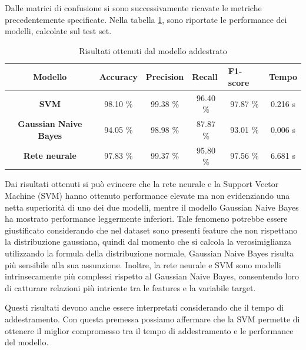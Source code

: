 Dalle matrici di confusione si sono successivamente ricavate le metriche
precedentemente specificate. Nella tabella \ref{tab:risultati}, sono riportate
le performance dei modelli, calcolate sul test set.
\begin{table}[!ht]
    \centering
    \begin{tabular}{@{}clllll@{}}
        \toprule
        \rowcolor[HTML]{EFEFEF}
        \textbf{Modello}                                      & \textbf{Accuracy}            & \textbf{Precision}           & \textbf{Recall}              & \textbf{F1-score}            & \textbf{Tempo}              \\ \midrule
        \cellcolor[HTML]{EFEFEF}\textbf{SVM}                  & \multicolumn{1}{c}{98.10 \%} & \multicolumn{1}{c}{99.38 \%} & \multicolumn{1}{c}{96.40 \%} & \multicolumn{1}{c}{97.87 \%} & \multicolumn{1}{c}{0.216 s} \\
        \cellcolor[HTML]{EFEFEF}\textbf{Gaussian Naive Bayes} & \multicolumn{1}{c}{94.05 \%} & \multicolumn{1}{c}{98.98 \%} & \multicolumn{1}{c}{87.87 \%} & \multicolumn{1}{c}{93.01 \%} & \multicolumn{1}{c}{0.006 s} \\
        \cellcolor[HTML]{EFEFEF}\textbf{Rete neurale}         & \multicolumn{1}{c}{97.83 \%} & \multicolumn{1}{c}{99.37 \%} & \multicolumn{1}{c}{95.80 \%} & \multicolumn{1}{c}{97.56 \%} & \multicolumn{1}{c}{6.681 s} \\ \bottomrule
    \end{tabular}
    \caption{Risultati ottenuti dal modello addestrato}
    \label{tab:risultati}
\end{table}

Dai risultati ottenuti si può evincere che la rete neurale e la Support Vector
Machine (SVM) hanno ottenuto performance elevate ma non evidenziando
una netta superiorità di uno dei due modelli, mentre il modello Gaussian
Naive Bayes ha mostrato performance leggermente inferiori. Tale fenomeno potrebbe
essere giustificato considerando che nel dataset sono presenti feature che non
rispettano la distribuzione gaussiana, quindi dal momento che si calcola la
verosimiglianza utilizzando la formula della distribuzione normale, Gaussian
Naive Bayes risulta più sensibile alla sua assunzione. Inoltre, la rete neurale
e SVM sono modelli intrinsecamente più complessi rispetto al Gaussian Naive
Bayes, consentendo loro di catturare relazioni più intricate tra le features e
la variabile target.

Questi risultati devono anche essere interpretati considerando che il tempo di
addestramento. Con questa premessa possiamo affermare che la SVM permette di
ottenere il miglior compromesso tra il tempo di addestramento e le performance
del modello.

